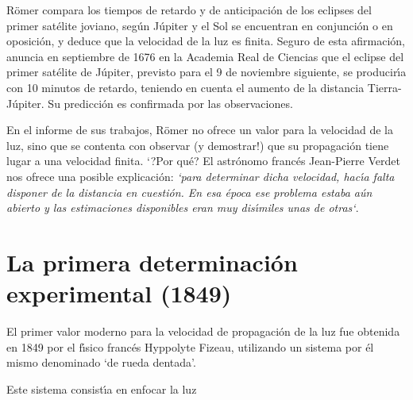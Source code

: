 \documentclass{article}
\begin{document}
R\"omer compara los tiempos de retardo y de anticipaci\'on de los eclipses
del primer sat\'elite joviano, seg\'un J\'upiter y el Sol se encuentran en
conjunci\'on o en oposici\'on, y deduce que la velocidad de la luz es finita.
Seguro de esta afirmaci\'on, anuncia en septiembre de 1676 en la Academia 
Real de Ciencias que el eclipse del primer sat\'elite de J\'upiter, previsto
para el 9 de noviembre siguiente, se producir\'\i a con 10 minutos de retardo,
teniendo en cuenta el aumento de la distancia Tierra-J\'upiter. Su predicci\'on
es confirmada por las observaciones.

En el informe de sus trabajos, R\"omer no ofrece un valor para la velocidad de
la luz, sino que se contenta con observar (y demostrar!) que su propagaci\'on
tiene lugar a una velocidad finita. `?Por qu\'e? El astr\'onomo franc\'es
Jean-Pierre Verdet nos ofrece una posible explicaci\'on: {\it `para determinar
dicha velocidad, hac\'\i a falta disponer de la distancia en cuesti\'on. 
En esa \'epoca ese problema estaba a\'un abierto y las estimaciones 
disponibles eran muy dis\'\i miles unas de otras`}. 

\section{La primera determinaci\'on experimental (1849)}

El primer valor moderno para la velocidad de propagaci\'on de la luz fue 
obtenida en 1849 por el f\'\i sico franc\'es Hyppolyte Fizeau, utilizando 
un sistema por \'el mismo denominado `de rueda dentada'. 

Este sistema consist\'\i a en enfocar la luz
\end{document}
